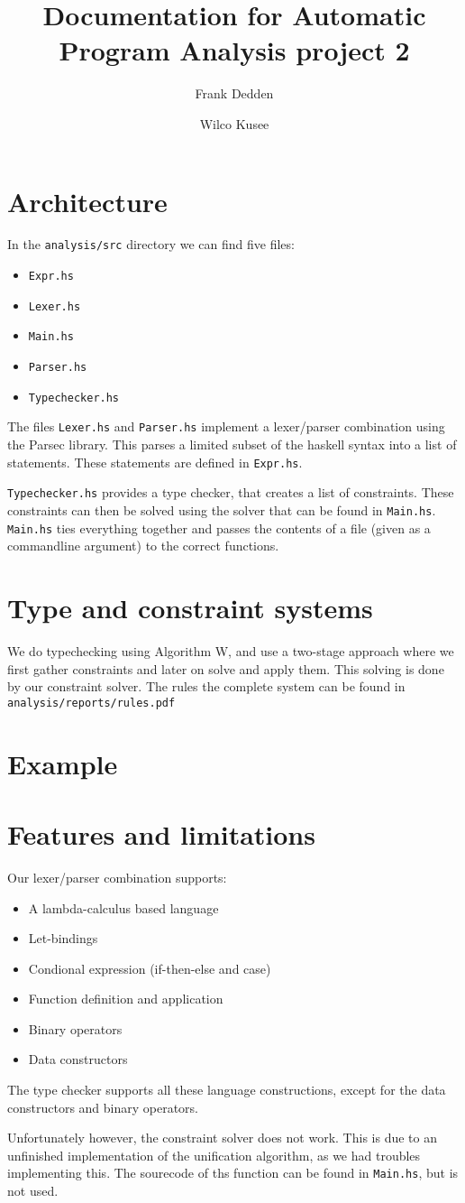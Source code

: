 \documentclass[10pt]{article}
\title{Documentation for Automatic Program Analysis project 2}
\author{Frank Dedden \and Wilco Kusee}
\begin{document}
\maketitle

\section{Architecture}
In the \texttt{analysis/src} directory we can find five files:
\begin{itemize}
	\item \texttt{Expr.hs}
	\item \texttt{Lexer.hs}
	\item \texttt{Main.hs}
	\item \texttt{Parser.hs}
	\item \texttt{Typechecker.hs}
\end{itemize}
The files \texttt{Lexer.hs} and \texttt{Parser.hs} implement a lexer/parser combination using the Parsec library. This parses a limited subset of the haskell syntax into a list of statements. These statements are defined in \texttt{Expr.hs}.

\texttt{Typechecker.hs} provides a type checker, that creates a list of constraints. These constraints can then be solved using the solver that can be found in \texttt{Main.hs}. \texttt{Main.hs} ties everything together and passes the contents of a file (given as a commandline argument) to the correct functions.

\section{Type and constraint systems}
We do typechecking using Algorithm W, and use a two-stage approach where we first gather constraints and later on solve and apply them. This solving is done by our constraint solver. The rules the complete system can be found in \texttt{analysis/reports/rules.pdf}

\section{Example}


\section{Features and limitations}
Our lexer/parser combination supports:
\begin{itemize}
	\item A lambda-calculus based language
	\item Let-bindings
	\item Condional expression (if-then-else and case)
	\item Function definition and application
	\item Binary operators
	\item Data constructors
\end{itemize}
The type checker supports all these language constructions, except for the data constructors and binary operators.

Unfortunately however, the constraint solver does not work. This is due to an unfinished implementation of the unification algorithm, as we had troubles implementing this. The sourecode of ths function can be found in \texttt{Main.hs}, but is not used.
\end{document}
